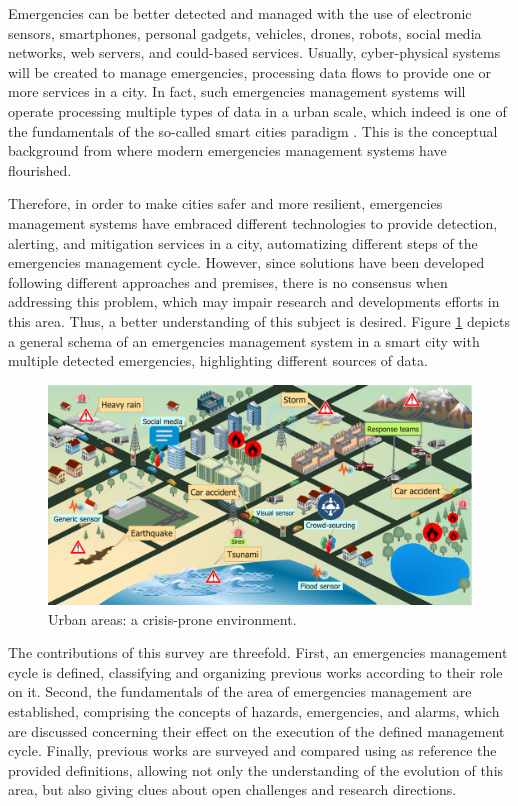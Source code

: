 \begin{refsection}
Emergencies can be better detected and managed with the use of electronic sensors, smartphones, personal gadgets, vehicles, drones, robots, social media networks, web servers, and could-based services. Usually, cyber-physical systems will be created to manage emergencies, processing data flows to provide one or more services in a city. In fact, such emergencies management systems will operate processing multiple types of data in a urban scale, which indeed is one of the fundamentals of the so-called smart cities paradigm \cite{smartcities4}. This is the conceptual background from where modern emergencies management systems have flourished.

Therefore, in order to make cities safer and more resilient, emergencies management systems have embraced different technologies to provide detection, alerting, and mitigation services in a city, automatizing different steps of the emergencies management cycle. However, since solutions have been developed following different approaches and premises, there is no consensus when addressing this problem, which may impair research and developments efforts in this area. Thus, a better understanding of this subject is desired. Figure \ref{Fig:general} depicts a general schema of an emergencies management system in a smart city with multiple detected emergencies, highlighting different sources of data.

\begin{figure}[htbp]
  \centering
  \includegraphics[scale=0.35]{Chapters/1-Survey/images/general.pdf}
  \caption{Urban areas: a crisis-prone environment.}\label{Fig:general}
\end{figure}

The contributions of this survey are threefold. First, an emergencies management cycle is defined, classifying and organizing previous works according to their role on it. Second, the fundamentals of the area of emergencies management are established, comprising the concepts of hazards, emergencies, and alarms, which are discussed concerning their effect on the execution of the defined management cycle. Finally, previous works are surveyed and compared using as reference the provided definitions, allowing not only the understanding of the evolution of this area, but also giving clues about open challenges and research directions.


\end{refsection}

